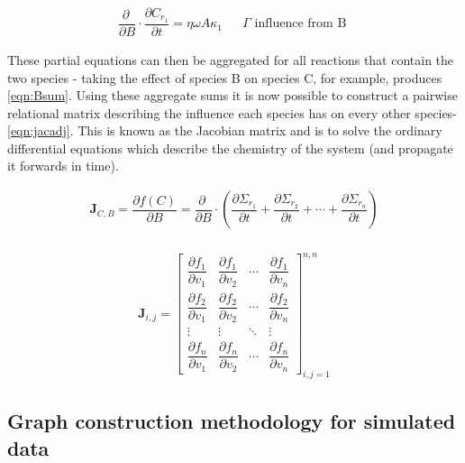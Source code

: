 \begin{eqnarray} 
   \dfrac{\partial \ }{\partial B}\cdot \dfrac{\partial C_{r_1}}{\partial t} = \eta \omega A \kappa_1 & &  \Gamma \text{ influence from B }\label{eqn:B}%
\end{eqnarray}
      
These partial equations can then be aggregated for all reactions that contain the two species - taking the effect of species B on species C, for example, produces \autoref{eqn:Bsum}. Using these aggregate sums it is now possible to construct a pairwise relational matrix describing the influence each species has on every other species- \autoref{eqn:jacadj}. This is known as the Jacobian matrix and is to solve the ordinary differential equations which describe the chemistry of the system (and propagate it forwards in time). 
 
               
\begin{eqnarray}
   \mathbf{J}_{C,B} = \dfrac{\partial f(C) }{\partial B} =
\dfrac{\partial \ }{\partial B} \cdot \left( \dfrac{\partial \Sigma_{r_1}}{\partial t} + \dfrac{\partial \Sigma_{r_2}}{\partial t} + \cdots +\dfrac{\partial \Sigma_{r_n}}{\partial t} \right)
\label{eqn:Bsum}
\end{eqnarray}\\

\begin{eqnarray}
 \mathbf{J}_{i,j} =
 \begin{bmatrix}
   \dfrac{\partial f_1}{\partial v_1} &
     \dfrac{\partial f_1}{\partial v_2} &
     \cdots &
     \dfrac{\partial f_1}{\partial v_n} \\[13pt]
   \dfrac{\partial f_2}{\partial v_1} &
     \dfrac{\partial f_2}{\partial v_2} &
       \cdots &
     \dfrac{\partial f_2}{\partial v_n} \\[13pt]
       \vdots &
     \vdots & \ddots
        &
     \vdots\\[13pt]
   \dfrac{\partial f_n}{\partial v_1} &
     \dfrac{\partial f_n}{\partial v_2} &
       \cdots &
     \dfrac{\partial f_n}{\partial v_n}
 \end{bmatrix}_{i,j=1}^{n,n}
 \label{eqn:jacadj}
\end{eqnarray}



\subsection{Graph construction methodology for simulated data}\label{sec:graphconstruction}

